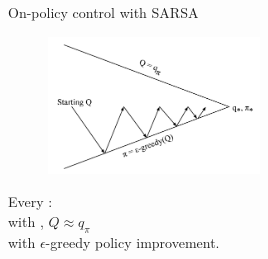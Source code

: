 \bgroup
\begin{frame}{On-policy control with SARSA}
\begin{figure}
\centering
\includegraphics[width=0.5\textwidth]{img/sarsa_control.pdf}
\end{figure}
Every :\\
 with , $Q\approx q_{\pi}$\\
 with $\epsilon$-greedy policy improvement.
\end{frame}
\egroup